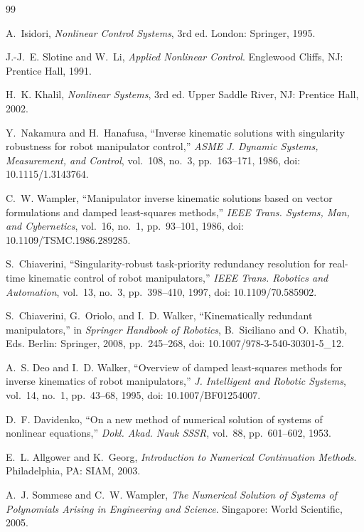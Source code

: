 \documentclass[11pt,american]{article}
\theoremstyle{definition}
\theoremstyle{plain}
\theoremstyle{remark}
\begin{document}
\begin{thebibliography}{99}

 A.~Isidori, \emph{Nonlinear Control Systems}, 3rd ed. London: Springer, 1995.

 J.-J.~E. Slotine and W.~Li, \emph{Applied Nonlinear Control}. Englewood Cliffs, NJ: Prentice Hall, 1991.

 H.~K. Khalil, \emph{Nonlinear Systems}, 3rd ed. Upper Saddle River, NJ: Prentice Hall, 2002.

 Y.~Nakamura and H.~Hanafusa, ``Inverse kinematic solutions with singularity robustness for robot manipulator control,'' \emph{ASME J. Dynamic Systems, Measurement, and Control}, vol.~108, no.~3, pp.~163--171, 1986, doi: 10.1115/1.3143764.

 C.~W. Wampler, ``Manipulator inverse kinematic solutions based on vector formulations and damped least-squares methods,'' \emph{IEEE Trans. Systems, Man, and Cybernetics}, vol.~16, no.~1, pp.~93--101, 1986, doi: 10.1109/TSMC.1986.289285.

 S.~Chiaverini, ``Singularity-robust task-priority redundancy resolution for real-time kinematic control of robot manipulators,'' \emph{IEEE Trans. Robotics and Automation}, vol.~13, no.~3, pp.~398--410, 1997, doi: 10.1109/70.585902.

 S.~Chiaverini, G.~Oriolo, and I.~D. Walker, ``Kinematically redundant manipulators,'' in \emph{Springer Handbook of Robotics}, B.~Siciliano and O.~Khatib, Eds. Berlin: Springer, 2008, pp.~245--268, doi: 10.1007/978-3-540-30301-5\_12.

 A.~S. Deo and I.~D. Walker, ``Overview of damped least-squares methods for inverse kinematics of robot manipulators,'' \emph{J. Intelligent and Robotic Systems}, vol.~14, no.~1, pp.~43--68, 1995, doi: 10.1007/BF01254007.

 D.~F. Davidenko, ``On a new method of numerical solution of systems of nonlinear equations,'' \emph{Dokl. Akad. Nauk SSSR}, vol.~88, pp.~601--602, 1953.

 E.~L. Allgower and K.~Georg, \emph{Introduction to Numerical Continuation Methods}. Philadelphia, PA: SIAM, 2003.

 A.~J. Sommese and C.~W. Wampler, \emph{The Numerical Solution of Systems of Polynomials Arising in Engineering and Science}. Singapore: World Scientific, 2005.


\end{thebibliography}
\end{document}
